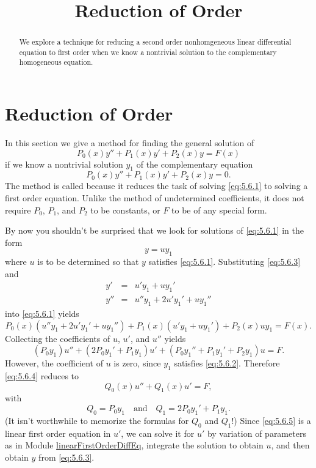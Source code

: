 \documentclass{ximera}
\title{Reduction of Order}
\begin{document}
 
\begin{abstract}
 We explore a technique for reducing a second order nonhomgeneous linear differential equation to first order when we know a nontrivial solution to the complementary homogeneous equation.
\end{abstract}
 
\maketitle
 
\section*{Reduction of Order}
 
In this section we give a method for finding the general
solution of
\begin{equation} \label{eq:5.6.1}
P_0(x)y''+P_1(x)y'+P_2(x)y=F(x)
\end{equation}
if we know  a nontrivial solution $y_1$ of the complementary equation
\begin{equation} \label{eq:5.6.2}
P_0(x)y''+P_1(x)y'+P_2(x)y=0.
\end{equation}
The method is called  because it reduces
the task of solving \eqref{eq:5.6.1} to solving a first order equation.
Unlike the method of undetermined coefficients, it does not require
$P_0$, $P_1$, and $P_2$ to be constants, or $F$ to be of any special
form.
 
By now you shouldn't be surprised that we look for
solutions of \eqref{eq:5.6.1} in the form
\begin{equation} \label{eq:5.6.3}
y=uy_1
\end{equation}
where $u$ is to be determined so that $y$ satisfies \eqref{eq:5.6.1}.
Substituting \eqref{eq:5.6.3} and
$$\begin{array}{rcl}
y'&=& u'y_1+uy_1' \\
y''&=& u''y_1+2u'y_1'+uy_1''
\end{array}$$
into \eqref{eq:5.6.1} yields
$$
P_0(x)(u''y_1+2u'y_1'+uy_1'')+P_1(x)(u'y_1+uy_1')+P_2(x)uy_1=F(x).
$$
Collecting the coefficients of $u$, $u'$, and $u''$ yields
\begin{equation} \label{eq:5.6.4}
(P_0y_1)u''+(2P_0y_1'+P_1y_1)u'+(P_0y_1''+P_1y_1'+P_2y_1)
u=F.
\end{equation}
However, the coefficient of $u$ is zero, since $y_1$ satisfies
\eqref{eq:5.6.2}. Therefore \eqref{eq:5.6.4} reduces to
\begin{equation} \label{eq:5.6.5}
Q_0(x)u''+Q_1(x)u'=F,
\end{equation}
with
$$
Q_0=P_0y_1 \quad\mbox{and}\quad Q_1=2P_0y_1'+P_1y_1.
$$
(It isn't worthwhile to memorize the formulas for $Q_0$ and $Q_1$!)
Since \eqref{eq:5.6.5} is a linear first order equation in $u'$, we can
solve it for $u'$ by variation of parameters as in
Module \href{https://ximera.osu.edu/ode/main/linearFirstOrderDiffEq/linearFirstOrderDiffEq}{linearFirstOrderDiffEq}, integrate the solution to obtain $u$, and then
obtain $y$ from \eqref{eq:5.6.3}.
 
\end{document}
